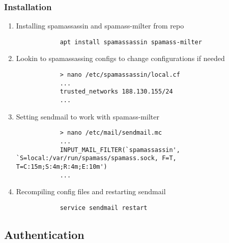 \documentclass[10pt]{article}
\begin{document}
    \subsubsection{Installation}
    \begin{enumerate}
        \item Installing spamassassin and spamass-milter from repo
        \begin{verbatim}
            apt install spamassassin spamass-milter
        \end{verbatim}
        \item Lookin to spamassassing configs to change configurations if needed
        \begin{verbatim}
            > nano /etc/spamassassin/local.cf
            ...
            trusted_networks 188.130.155/24
            ...
        \end{verbatim}
        \item Setting sendmail to work with spamass-milter
        \begin{verbatim}
            > nano /etc/mail/sendmail.mc
            ...
            INPUT_MAIL_FILTER(`spamassassin', `S=local:/var/run/spamass/spamass.sock, F=T, T=C:15m;S:4m;R:4m;E:10m')
            ...
        \end{verbatim}
        \item Recompiling config files and restarting sendmail
        \begin{verbatim}
            service sendmail restart
        \end{verbatim}
    \end{enumerate}


    \subsection{Authentication}
\end{document}
